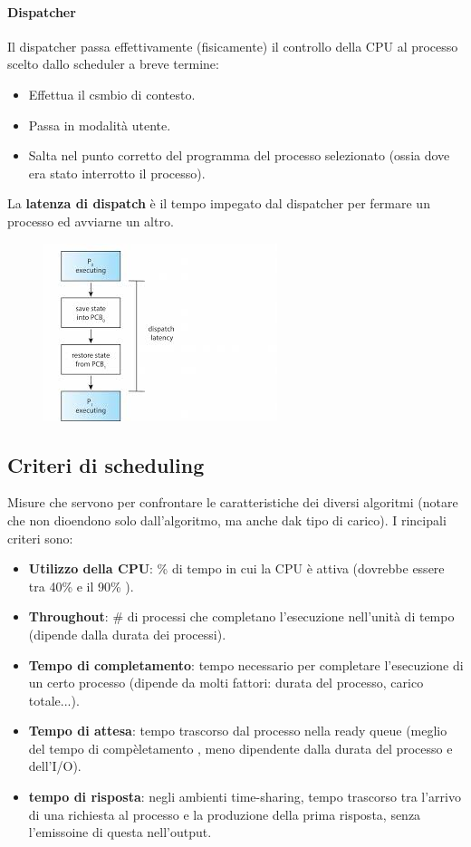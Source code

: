\documentclass[11pt]{article}
\begin{document}
\paragraph{Dispatcher} Il dispatcher passa effettivamente (fisicamente) il controllo della CPU al processo scelto dallo scheduler a breve termine:
\begin{itemize}
	\item Effettua il csmbio di contesto.
	\item Passa in modalità utente.
	\item Salta nel punto corretto del programma del processo selezionato (ossia dove era stato interrotto il processo).
\end{itemize}
La \textbf{latenza di dispatch} è il tempo impegato dal dispatcher per fermare un processo ed avviarne un altro.
\begin{figure}[H]
\includegraphics[scale=0.6]{dispatchLatency.jpg}
\centering
\end{figure}

\subsection{Criteri di scheduling}
Misure che servono per confrontare le caratteristiche dei diversi algoritmi (notare che non dioendono solo dall'algoritmo, ma anche dak tipo di carico).
I rincipali criteri sono:
\begin{itemize}
	\item \textbf{Utilizzo della CPU}: \% di tempo in cui la CPU è attiva (dovrebbe essere tra 40\% e il 90\% ).
	\item \textbf{Throughout}: \# di processi che completano l'esecuzione nell'unità di tempo (dipende dalla durata dei processi).
	\item \textbf{Tempo di completamento}: tempo necessario per completare l'esecuzione di un certo processo (dipende da molti fattori: durata del processo, carico totale...).
	\item \textbf{Tempo di attesa}: tempo trascorso dal processo nella ready queue (meglio del tempo di compèletamento , meno dipendente dalla durata del processo e dell'I/O).
	\item \textbf{tempo di risposta}: negli ambienti time-sharing, tempo trascorso tra l'arrivo di una richiesta al processo e la produzione della prima risposta, senza l'emissoine di questa nell'output.
\end{itemize}
\end{document}
